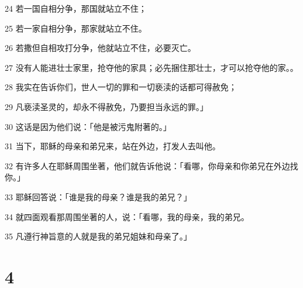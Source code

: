 \par 24 若一国自相分争，那国就站立不住；
\par 25 若一家自相分争，那家就站立不住。
\par 26 若撒但自相攻打分争，他就站立不住，必要灭亡。
\par 27 没有人能进壮士家里，抢夺他的家具；必先捆住那壮士，才可以抢夺他的家。。
\par 28 我实在告诉你们，世人一切的罪和一切亵渎的话都可得赦免；
\par 29 凡亵渎圣灵的，却永不得赦免，乃要担当永远的罪。」
\par 30 这话是因为他们说：「他是被污鬼附著的。」
\par 31 当下，耶稣的母亲和弟兄来，站在外边，打发人去叫他。
\par 32 有许多人在耶稣周围坐著，他们就告诉他说：「看哪，你母亲和你弟兄在外边找你。」
\par 33 耶稣回答说：「谁是我的母亲？谁是我的弟兄？」
\par 34 就四面观看那周围坐著的人，说：「看哪，我的母亲，我的弟兄。
\par 35 凡遵行神旨意的人就是我的弟兄姐妹和母亲了。」

\chapter{4}


